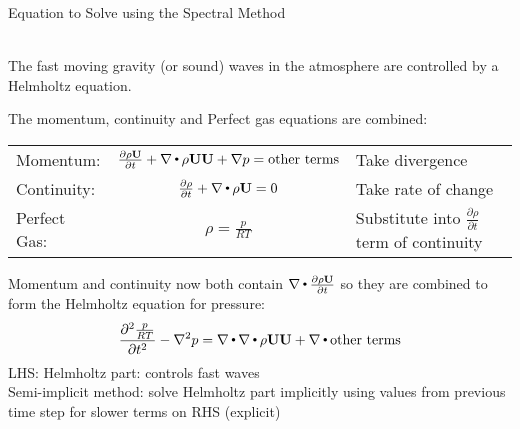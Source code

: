 \begin{slide}{Equation to Solve using the Spectral Method}

\ \\
The fast moving gravity (or sound) waves in the atmosphere are controlled by a Helmholtz equation.

The momentum, continuity and Perfect gas equations are combined:

\setlength{\tabcolsep}{12pt}
\renewcommand{\arraystretch}{2}
\begin{tabular}{lcl}
Momentum:
&
$\frac{\partial\rho\mathbf U}{\partial t} + \nabla\,{\scriptscriptstyle \stackrel{\bullet}{{}}}\,\rho\mathbf U\mathbf U + \nabla p = \text{other terms}$
&
Take divergence
\\
Continuity:
&
$\frac{\partial\rho}{\partial t} + \nabla\,{\scriptscriptstyle \stackrel{\bullet}{{}}}\,\rho\mathbf U = 0$
&
Take rate of change
\\
Perfect Gas:
&
$\rho=\frac{p}{RT}$
&
Substitute into $\frac{\partial\rho}{\partial t}$ term of continuity
\end{tabular}

Momentum and continuity now both contain $\nabla\,{\scriptscriptstyle \stackrel{\bullet}{{}}}\,\frac{\partial\rho\mathbf U}{\partial t}$ so they are combined to form the Helmholtz equation for pressure:
\[
\frac{\partial^2 \frac{p}{RT}}{\partial t^2} - \nabla^2 p = \nabla\,{\scriptscriptstyle \stackrel{\bullet}{{}}}\,\nabla\,{\scriptscriptstyle \stackrel{\bullet}{{}}}\,\rho\mathbf U\mathbf U + \nabla\,{\scriptscriptstyle \stackrel{\bullet}{{}}}\,\text{other terms}
\]
LHS: Helmholtz part: controls fast waves\\
Semi-implicit method: solve Helmholtz part implicitly using values from previous time step for slower terms on RHS (explicit)
\end{slide}

